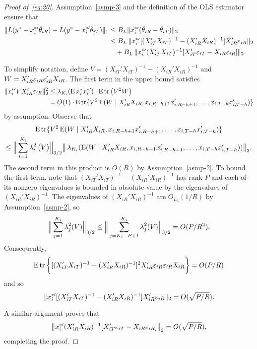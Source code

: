 \documentclass[12pt,draft]{article}
\begin{document}
\begin{proof}[Proof of~\eqref{eq:20}]
Assumption~\ref{asmp-3} and the definition of the OLS estimator
ensure that
\begin{align*}
  \|L(y^{*} -  x_i^{*\prime} \hat\theta_{iR}) - L(y^{*} - x_i^{*\prime} \hat\theta_{iT}) \|_1
  &\leq B_{L} \| x_i^{*\prime} (\hat\theta_{iR} - \hat\theta_{iT}) \|_2 \\
  &\leq B_{L} \, \| x_i^{*\prime} [(X_{iT}'X_{iT})^{-1} -
  (X_{iR}'X_{iR})^{-1}] X_{iR}' \mathbf{\varepsilon}_{iR} \|_2 \\
  &\quad+ B_L \, \| x_i^{*\prime}
  (X_{iT}'X_{iT})^{-1}[X_{iT}'\mathbf{\varepsilon}_{iT} - X_{iR}
  \mathbf{\varepsilon}_{iR} ] \|_2 .
\end{align*}

To simplify notation, define $V = (X_{iT}'X_{iT})^{-1} -
(X_{iR}'X_{iR})^{-1}$ and $W = X_{iR}'\mathbf{\varepsilon}_{iR} \mathbf{\varepsilon}_{iR}'X_{iR}$. The
first term in the upper bound satisfies
\begin{align*}
  \| x_i^{*\prime} V X_{iR}' \mathbf{\varepsilon}_{iR} \|_2^2
  &\leq \operatorname{\lambda}_{K_i}(\operatorname{E} x_i^* x_i^{*\prime}) \cdot \operatorname{E} \operatorname{tr}\big( V^2 W \big) \\
  &= O(1) \cdot \operatorname{E} \operatorname{tr}\{ V^2 \operatorname{E}(W \mid
  X_{iR}'X_{iR}, x_{i,R-h+1} x_{i,R-h+1}',\dots, x_{i,T-h} x_{i,T-h}')\}
\end{align*}
by assumption. Observe that
\begin{multline*}
  \operatorname{E} \operatorname{tr}\{ V^2 \operatorname{E}(W \mid X_{iR}'X_{iR}, x_{i,R-h+1} x_{i,R-h+1}',\dots, x_{i,T-h} x_{i,T-h}')\}
  \\ \leq
  \Big\rVert \sum_{i=1}^{K_i} \operatorname{\lambda}_i^2 \big(V\big) \Big\rVert_{3/2}
  \big\rVert \operatorname{\lambda}_{K_i}(\operatorname{E}(W \mid
  X_{iR}'X_{iR}, x_{i,R-h+1} x_{i,R-h+1}',\dots, x_{i,T-h} x_{i,T-h}')) \big\rVert_3.
\end{multline*}
The second term in this product is $O(R)$ by
Assumption~\ref{asmp-2}. To bound the first term, note that
$(X_{iT}'X_{iT})^{-1} - (X_{iR}'X_{iR})^{-1}$ has rank $P$ and
each of its nonzero eigenvalues is bounded in absolute value by the
eigenvalues of $(X_{iR}'X_{iR})^{-1}$. The eigenvalues of
$(X_{iR}'X_{iR})^{-1}$ are $O_{L_3}(1/R)$ by Assumption~\ref{asmp-2}, so
\begin{equation*}
  \Big\|\sum_{j=1}^{K_i}
  \operatorname{\lambda}_j^2(V)\Big\|_{3/2}
  \leq \Big\|\sum_{j=K_i - P+1}^{K_i} \operatorname{\lambda}_j^2(V) \Big\|_{3/2}
  = O(P/R^2).
\end{equation*}
Consequently,
\begin{equation*}
  \operatorname{E} \operatorname{tr}\bigg\{[(X_{iT}'X_{iT})^{-1} - (X_{iR}'X_{iR})^{-1}]^2
  X_{iR}'\mathbf{\varepsilon}_{iR} \mathbf{\varepsilon}_{iR}X_{iR} \bigg\} = O(P/R)
\end{equation*}
and so
\begin{equation*}
  \| x_i^{*\prime} [(X_{iT}'X_{iT})^{-1} -
  (X_{iR}'X_{iR})^{-1}] X_{iR}' \mathbf{\varepsilon}_{iR} \|_2 = O(\sqrt{P/R}).
\end{equation*}

A similar argument proves that
\begin{equation*}
  \big\| x_i^{*\prime} (X_{iR}'X_{iR})^{-1}
  [X_{iT}'\mathbf{\varepsilon}_{iT} - X_{iR} \mathbf{\varepsilon}_{iR} ] \big\|_2 =  O(\sqrt{P/R}),
\end{equation*}
completing the proof.
\end{proof}
\end{document}

